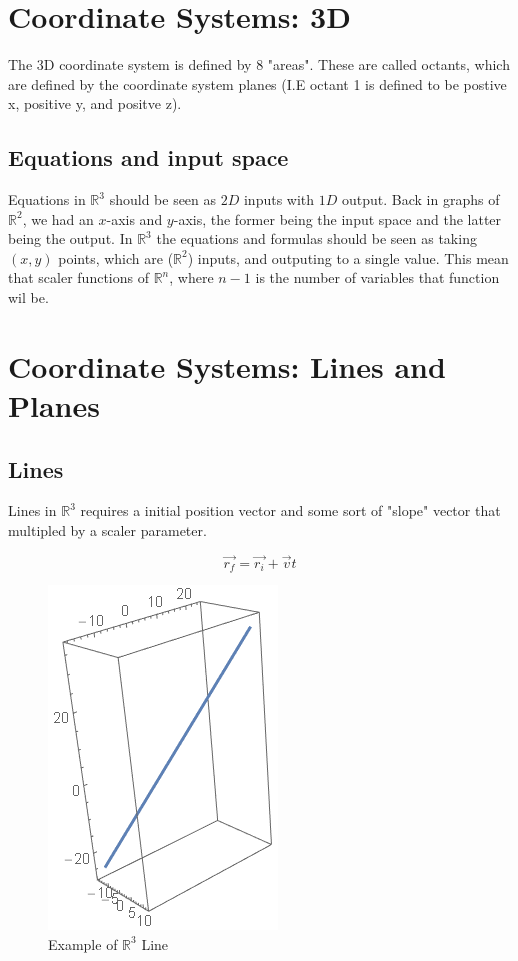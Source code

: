 \section{Coordinate Systems: 3D}
The 3D coordinate system is defined by 8 "areas". These are called octants, which are defined by the coordinate system planes (I.E octant 1 is defined to be postive x, positive y, and positve z). 

\subsection{Equations and input space}
Equations in $\mathbb{R}^3$ should be seen as $2D$ inputs with $1D$ output. Back in graphs of $\mathbb{R}^2$, we had an $x$-axis and $y$-axis, the former being the input space and the latter being the output. In $\mathbb{R}^3$ the equations and formulas should be seen as taking $(x, y)$ points, which are ($\mathbb{R}^2$) inputs, and outputing to a single value. This mean that scaler functions of $\mathbb{R}^n$, where $n-1$ is the number of variables that function wil be. 

\section{Coordinate Systems: Lines and Planes}
\subsection{Lines}
Lines in $\mathbb{R}^3$ requires a initial position vector and some sort of "slope" vector that multipled by a scaler parameter. 

\begin{equation*}
	\vec{r_f} = \vec{r_i} + \vec{v}t 
\end{equation*}

\begin{figure}[H]
	\begin{center}
		\includegraphics[scale=0.45]{pages/images/simple_line.png}
		\caption{Example of $\mathbb{R}^3$ Line}	
		\label{fig:test_figure}
	\end{center}
\end{figure}

